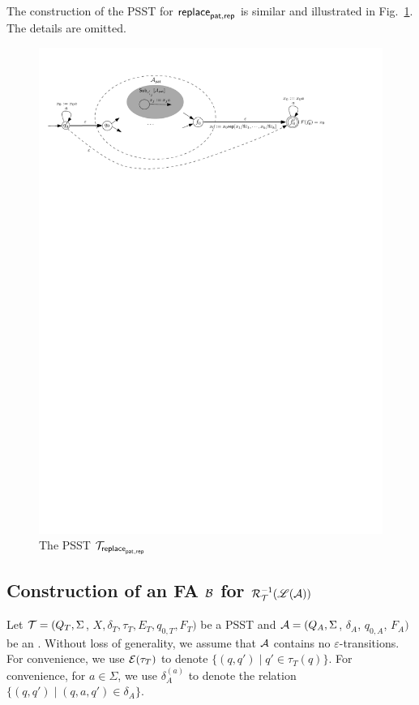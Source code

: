         The construction of the PSST for $\mathsf{replace}_{\mathsf{pat}, \mathsf{rep}}$ is similar and illustrated in Fig.~\ref{fig-psst-replace}. The details are omitted.
        \begin{figure}[ht]
            \centering
            \includegraphics[width=\textwidth]{psst-replace.pdf}
            \caption{The PSST $\mathcal{T}_{\mathsf{replace}_{\mathsf{pat},\mathsf{rep}}}$}
            \label{fig-psst-replace}
        \end{figure}


        \subsection{Construction of an FA $\mathcal{B}$ for $\mathcal{R}^{-1}_{\mathcal{T}}(\mathscr{L}(\mathcal{A}))$}\label{app-pre-image}


        Let $\mathcal{T} = (Q_T, \Sigma$, $X, \delta_T, \tau_T, E_T,  q_{0, T}, F_T)$ be a PSST  and $\mathcal{A}
        = (Q_A, \Sigma$, $\delta_A$, $q_{0, A}$, $F_A)$ be an \FA{}. Without loss of generality, we assume that $\mathcal{A}$ contains no $\varepsilon$-transitions. For convenience, we use $\mathcal{E}(\tau_T)$ to denote $\{(q, q') \mid q' \in \tau_T(q)\}$. For convenience, for $a \in \Sigma$, we use $\delta^{(a)}_A$ to denote the  relation $\{(q, q') \mid (q, a, q') \in \delta_A\}$.

